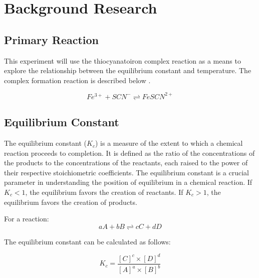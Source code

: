 \section{Background Research}
\subsection{Primary Reaction}
\noindent
This experiment will use the thiocyanatoiron complex reaction as a means to explore the relationship between the equilibrium constant and temperature. The complex formation reaction is described below \citep{buffalostateChemicalEquilibrium}.

\begin{equation*}
    Fe^{3+} + SCN^- \rightleftharpoons FeSCN^{2+}
\end{equation*}

\subsection{Equilibrium Constant}
The equilibrium constant (\(K_c\)) is a measure of the extent to which a chemical reaction proceeds to completion. It is defined as the ratio of the concentrations of the products to the concentrations of the reactants, each raised to the power of their respective stoichiometric coefficients. The equilibrium constant is a crucial parameter in understanding the position of equilibrium in a chemical reaction. If \(K_c < 1\), the equilibrium favors the creation of reactants. If \(K_c > 1\), the equilibrium favors the creation of products. \citep{hammett1935some}

\noindent
\newline
For a reaction:
\begin{equation*}
    aA + bB \rightleftharpoons cC + dD
\end{equation*}

\noindent
The equilibrium constant can be calculated as follows:

\begin{equation}
    K_c=\frac{[C]^c \times [D]^d}{[A]^a \times [B]^b}
\end{equation}


